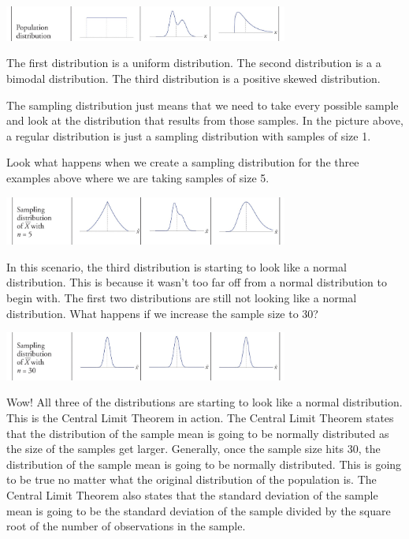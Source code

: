 \documentclass[
  letterpaper,
  DIV=11,
  numbers=noendperiod]{scrreprt}
\begin{document}
\includegraphics[width=0.7\textwidth,height=\textheight]{./images/EPCI_4.jpg}

The first distribution is a uniform distribution. The second
distribution is a a bimodal distribution. The third distribution is a
positive skewed distribution.

The sampling distribution just means that we need to take every possible
sample and look at the distribution that results from those samples. In
the picture above, a regular distribution is just a sampling
distribution with samples of size 1.

Look what happens when we create a sampling distribution for the three
examples above where we are taking samples of size 5.

\includegraphics[width=0.7\textwidth,height=\textheight]{./images/EPCI_5.jpg}

In this scenario, the third distribution is starting to look like a
normal distribution. This is because it wasn't too far off from a normal
distribution to begin with. The first two distributions are still not
looking like a normal distribution. What happens if we increase the
sample size to 30?

\includegraphics[width=0.7\textwidth,height=\textheight]{./images/EPCI_6.jpg}

Wow! All three of the distributions are starting to look like a normal
distribution. This is the Central Limit Theorem in action. The Central
Limit Theorem states that the distribution of the sample mean is going
to be normally distributed as the size of the samples get larger.
Generally, once the sample size hits 30, the distribution of the sample
mean is going to be normally distributed. This is going to be true no
matter what the original distribution of the population is. The Central
Limit Theorem also states that the standard deviation of the sample mean
is going to be the standard deviation of the sample divided by the
square root of the number of observations in the sample.
\end{document}

